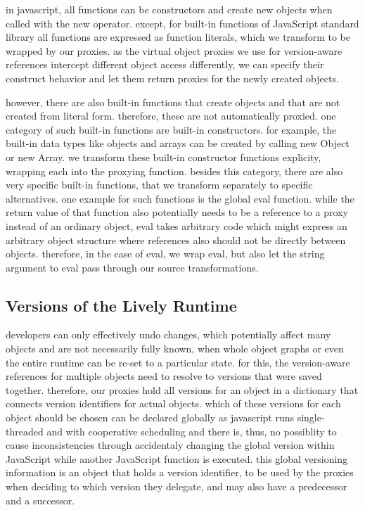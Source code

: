 in javascript, all functions can be constructors and create new objects when called with the new operator.
except, for built-in functions of JavaScript standard library all functions are expressed as function literals, which we transform to be wrapped by our proxies.
as the virtual object proxies we use for version-aware references intercept different object access differently, we can specify their construct behavior and let them return proxies for the newly created objects.

however, there are also built-in functions that create objects and that are not created from literal form.
therefore, these are not automatically proxied.
one category of such built-in functions are built-in constructors.
for example, the built-in data types like objects and arrays can be created by calling new Object or new Array.
we transform these built-in constructor functions explicity, wrapping each into the proxying function.
besides this category, there are also very specific built-in functions, that we transform separately to specific alternatives.
one example for such functions is the global eval function.
while the return value of that function also potentially needs to be a reference to a proxy instead of an ordinary object, eval takes arbitrary code which might express an arbitrary object structure where references also should not be directly between objects.
therefore, in the case of eval, we wrap eval, but also let the string argument to eval pass through our source transformations.


\subsection{Versions of the Lively Runtime}

developers can only effectively undo changes, which potentially affect many objects and are not necessarily fully known, when whole object graphs or even the entire runtime can be re-set to a particular state.
for this, the version-aware references for multiple objects need to resolve to versions that were saved together.
therefore, our proxies hold all versions for an object in a dictionary that connects version identifiers for actual objects.
which of these versions for each object should be chosen can be declared globally as javascript runs single-threaded and with cooperative scheduling and there is, thus, no possiblity to cause inconsistencies through accidentaly changing the global version within JavaScript while another JavaScript function is executed.
this global versioning information is an object that holds a version identifier, to be used by the proxies when deciding to which version they delegate, and may also have a predecessor and a successor.


